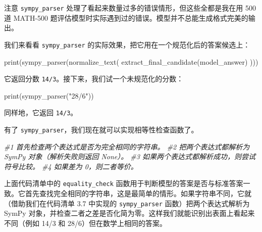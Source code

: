 \begin{myWarning}{注意}
 \texttt{sympy\_parser} 处理了看起来数量过多的错误情形，但这些全都是我在用 500 道 MATH-500 题评估模型时实际遇到过的错误。模型并不总能生成格式完美的输出。\end{myWarning}

我们来看看 \texttt{sympy\_parser} 的实际效果，把它用在一个规范化后的答案候选上：

\begin{codebox}
print(sympy_parser(normalize_text(
    extract_final_candidate(model_answer)
)))
\end{codebox}

它返回分数 \texttt{14/3}。接下来，我们试一个未规范化的分数：

\begin{codebox}
print(sympy_parser("28/6"))
\end{codebox}

同样地，它返回 \texttt{14/3}。

有了 \texttt{sympy\_parser}，我们现在就可以实现相等性检查函数了。

{\noindent\small\textit{\#1 首先检查两个表达式是否为完全相同的字符串。 \newline \#2 把两个表达式都解析为 SymPy 对象（解析失败则返回 None）。 \newline \#3 如果两个表达式都解析成功，则尝试符号比较。 \newline \#4 如果差为 0，则二者等价。}\par}

上面代码清单中的 \texttt{equality\_check} 函数用于判断模型的答案是否与标准答案一致。它首先查找完全相同的字符串，这是最简单的情形。如果字符串不同，它就（借助我们在代码清单 3.7 中实现的 \texttt{sympy\_parser} 函数）把两个表达式解析为 SymPy 对象，并检查二者之差是否化简为零。这样我们就能识别出表面上看起来不同（例如 14/3 和 28/6）但在数学上相同的答案。

